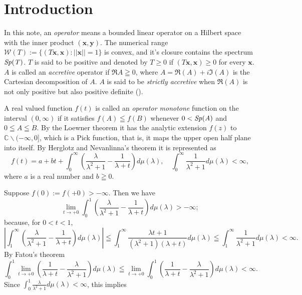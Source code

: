 \documentclass[reqno]{amsart}
\theoremstyle{definition}
\theoremstyle{remark}
\begin{document}
\maketitle
\section{Introduction}
In this note, an {\it operator} means a bounded linear operator on a Hilbert space with the inner product $(\!\mathbf{x}, \mathbf{y}\!)$. The numerical range 
$\mathcal{W}(T)\!:=\{(\!T\mathbf{x}, \mathbf{x}\!): ||\mathbf{x}|| = 1\}$ 
is convex, and it's closure contains the spectrum $\it{Sp}(T)$.
 $T$ is said to be positive and denoted by $T\geq 0$ 
if $(\!T\mathbf{x}, \mathbf{x}\!)\geq 0$ for every $\mathbf{x}$. 
$A$ is called an {\it accretive} operator if 
 $\Re{A} \geqq 0$, where 
 $A = \Re(A) + i \Im(A)$ is the Cartesian decomposition of $A$. 
 $A$ is said to be {\it strictly accretive} when  
$\Re(A)$ is not only positive but also positive definite (\cite{Kato-book}). 
\par
A real valued function $f(t)$ is called 
an {\it operator monotone} function on the interval $(0, \infty)$ if it satisfies $f(A) \leqq f(B)$ whenever 
$0< \it{Sp}(A)$ and $0\leqq A \leqq B$.
 By the Loewner theorem it has the analytic extension $f(z)$ to $\mathbb{C} \smallsetminus (-\infty, 0]$, 
which is a Pick function, that is,  
it maps the upper open half plane into itself. By Herglotz and Nevanlinna's theorem it is represented as 
\begin{equation*}
f(t)= a + bt + \int_0^{\infty} (\frac{\lambda}{\lambda^2 +1} - \frac{1}{\lambda +t}) d\mu(\lambda), \quad 
\int_0^{\infty}\frac{1}{\lambda^2 + 1} d\mu (\lambda) <\infty, 
\end{equation*}
where $a$ is a real number and $b\geqq 0$. \par
Suppose $f(0):= f(+0) >-\infty$. Then we have 
$$\lim_{t\to +0}\int_0^1 (\frac{\lambda}{\lambda^2 +1} - \frac{1}{\lambda +t}) d\mu(\lambda) >-\infty;$$ 
because, for $0<t<1$, 
$$|\int_1^{\infty} (\frac{\lambda}{\lambda^2 +1} - \frac{1}{\lambda +t}) d\mu(\lambda)|\leqq 
\int_1^{\infty} \frac{\lambda t +1}{(\lambda^2 +1)(\lambda +t)} d\mu(\lambda) \leqq
\int_1^{\infty} \frac{1}{\lambda^2 +1} d\mu(\lambda) < \infty.$$
By Fatou's theorem 
$$\int_0^1\lim_{t\to +0} ( \frac{1}{\lambda +t} - \frac{\lambda}{\lambda^2 +1} )d\mu(\lambda) \leqq 
\lim_{t\to +0}\int_0^1 ( \frac{1}{\lambda +t} - \frac{\lambda}{\lambda^2 +1}) d\mu(\lambda)<\infty.$$
Since $\int_0^1 \frac{\lambda}{\lambda^2 +1} d\mu(\lambda)<\infty$, this implies  
\end{document}
